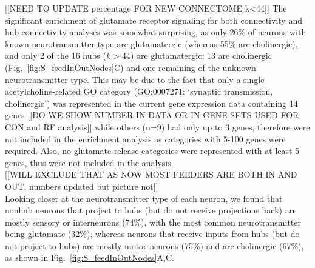 \documentclass[10pt,letterpaper]{article}
\begin{document}
[[NEED TO UPDATE percentage FOR NEW CONNECTOME k<44]]
The significant enrichment of glutamate receptor signaling for both connectivity and hub connectivity analyses was somewhat surprising, as only 26\% of neurons with known neurotransmitter type are glutamatergic (whereas 55\% are cholinergic), and only 2 of the 16 hubs ($k > 44$) are glutamatergic; 13 are cholinergic (Fig.~\ref{fig:S_feedInOutNodes}C) and one remaining of the unknown neurotransmitter type.
This may be due to the fact that only a single acetylcholine-related GO category (GO:0007271: `synaptic transmission, cholinergic') was represented in the current gene expression data containing 14 genes [[DO WE SHOW NUMBER IN DATA OR IN GENE SETS USED FOR CON and RF analysis]] while others (n=9) had only up to 3 genes, therefore were not included in the enrichment analysis as categories with 5-100 genes were required. 
Also, no glutamate release categories were represented with at least 5 genes, thus were not included in the analysis.\\

[[WILL EXCLUDE THAT AS NOW MOST FEEDERS ARE BOTH IN AND OUT, numbers updated but picture not]] \\
Looking closer at the neurotransmitter type of each neuron, we found that nonhub neurons that project to hubs (but do not receive projections back) are mostly sensory or interneurons (74\%), with the most common neurotransmitter being glutamate (32\%), whereas neurons that receive inputs from hubs (but do not project to hubs) are mostly motor neurons (75\%) and are cholinergic (67\%), as shown in Fig.~\ref{fig:S_feedInOutNodes}A,C.\\
\end{document}
